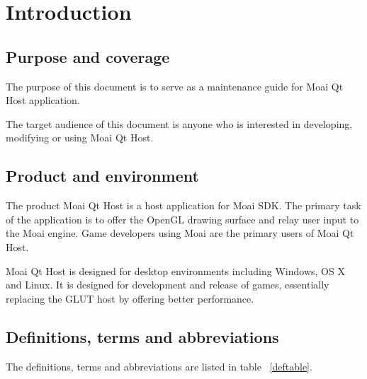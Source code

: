 \chapter{Introduction}
\label{chap:quick}

\section{Purpose and coverage}

The purpose of this document is to serve as a maintenance guide for Moai Qt Host application.

The target audience of this document is anyone who is interested in developing, modifying or using Moai Qt Host.

\section{Product and environment}

The product Moai Qt Host is a host application for Moai SDK. 
The primary task of the application is to offer the OpenGL drawing surface and relay user input to the Moai engine. 
Game developers using Moai are the primary users of Moai Qt Host.

Moai Qt Host is designed for desktop environments including Windows, OS X and Linux. It is designed for development and release of games, essentially replacing the GLUT host by offering better performance.

\section{Definitions, terms and abbreviations}

The definitions, terms and abbreviations are listed in table ~\ref{deftable}. 

